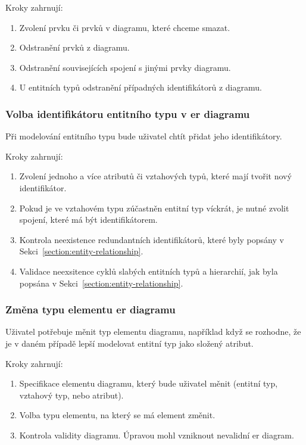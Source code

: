 Kroky zahrnují:
\begin{enumerate}
  \item Zvolení prvku či prvků v diagramu, které chceme smazat.
  \item Odstranění prvků z diagramu.
  \item Odstranění souvisejících spojení s jinými prvky diagramu.
  \item U entitních typů odstranění případných identifikátorů z diagramu.
\end{enumerate}

\subsubsection*{Volba identifikátoru entitního typu v \acrshort{er} diagramu}

Při modelování entitního typu bude uživatel chtít přidat jeho identifikátory.

Kroky zahrnují:
\begin{enumerate}
  \item Zvolení jednoho a více atributů či vztahových typů, které mají tvořit nový identifikátor.
  \item Pokud je ve vztahovém typu zúčastněn entitní typ víckrát, je nutné zvolit spojení, které má být identifikátorem.
  \item Kontrola neexistence redundantních identifikátorů, které byly popsány v Sekci~\ref{section:entity-relationship}.
  \item Validace neexsitence cyklů slabých entitních typů a hierarchií, jak byla popsána v Sekci~\ref{section:entity-relationship}.
\end{enumerate}

\subsubsection*{Změna typu elementu \acrshort{er} diagramu}

Uživatel potřebuje měnit typ elementu diagramu, například když se rozhodne, že je v daném případě lepší modelovat entitní typ jako složený atribut.

Kroky zahrnují:
\begin{enumerate}
  \item Specifikace elementu diagramu, který bude uživatel měnit (entitní typ, vztahový typ, nebo atribut).
  \item Volba typu elementu, na který se má element změnit.
  \item Kontrola validity diagramu. Úpravou mohl vzniknout nevalidní \acrshort{er} diagram.
\end{enumerate}

